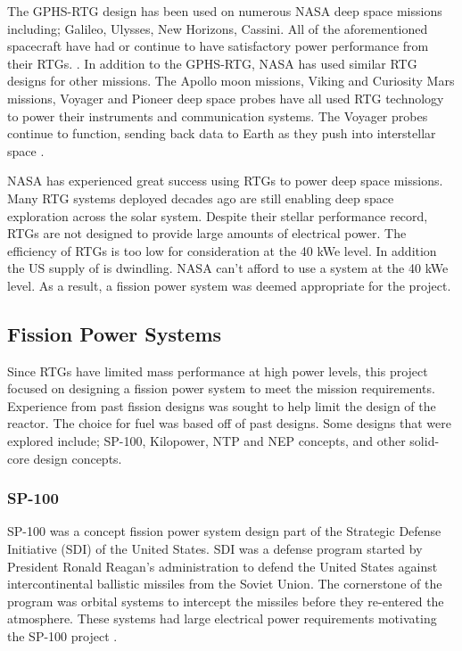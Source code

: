 The GPHS-RTG design has been used on
numerous NASA deep space missions including; Galileo, Ulysses, New Horizons,
Cassini. All of the aforementioned spacecraft have had or continue to have
satisfactory power performance from their RTGs. \citep{bennett_mission_2006}.
In addition to the GPHS-RTG, NASA has used similar RTG designs for other
missions. The Apollo moon missions, Viking and Curiosity Mars missions, Voyager
and Pioneer deep space probes have all used RTG technology to power their
instruments and communication systems. The Voyager probes continue to function,
sending back data to Earth as they push into interstellar space
\citep{mmrtg_fact}.

NASA has experienced great success using RTGs to power deep space missions. Many
RTG systems deployed decades ago are still enabling deep space exploration
across the solar system. Despite their stellar performance record, RTGs are not
designed to provide large amounts of electrical power. The efficiency of RTGs is
too low for consideration at the 40 kWe level. In addition the US supply of \pu
is dwindling. NASA can't afford to use a \pu system at the 40 kWe level. As a
result, a fission power system was deemed appropriate for the project.

\subsection{Fission Power Systems}
Since RTGs have limited mass performance at high power levels, this project focused on designing a
fission power system to meet the mission requirements. Experience from past
fission designs was sought to help limit the design of the reactor. The choice
for fuel was based off of past designs. Some designs that were explored include;
SP-100, Kilopower, NTP and NEP concepts, and other solid-core design concepts.
    
\subsubsection{SP-100}
    SP-100 was a concept fission power system design part of the
    Strategic Defense Initiative (SDI) of the United States. SDI was a defense program started by
    President Ronald Reagan's administration to defend the United States against intercontinental
    ballistic missiles from the Soviet Union. The cornerstone of the program was orbital systems to
    intercept the missiles before they re-entered the atmosphere. These systems
    had large electrical power requirements motivating the SP-100 project
    \citep{sp100}.


